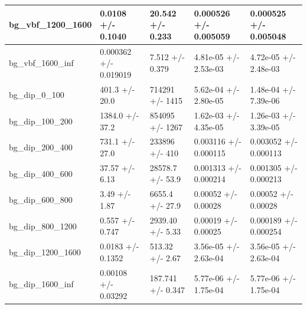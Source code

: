 \documentclass[a4paper, 10pt]{article}
\begin{document}
\begin{table}[H]
\begin{center}
\begin{tabular}{|m{20.0mm}|m{27.0mm}|m{27.0mm}|m{33.0mm}|m{32.0mm}|}
      \hline
      {\cellcolor{white}         bg\_vbf\_1200\_1600}& {\cellcolor{white}         0.0108 +/\-- 0.1040}& {\cellcolor{white}         20.542 +/\-- 0.233}& {\cellcolor{white}         0.000526 +/\-- 0.005059}& {\cellcolor{white}         0.000525 +/\-- 0.005048}\\
      \hline
      {\cellcolor{white}         bg\_vbf\_1600\_inf}& {\cellcolor{white}         0.000362 +/\-- 0.019019}& {\cellcolor{white}         7.512 +/\-- 0.379}& {\cellcolor{white}         4.81e-05 +/\-- 2.53e-03}& {\cellcolor{white}         4.72e-05 +/\-- 2.48e-03}\\
      \hline
      {\cellcolor{white}         bg\_dip\_0\_100}& {\cellcolor{white}         401.3 +/\-- 20.0}& {\cellcolor{white}         714291 +/\-- 1415}& {\cellcolor{white}         5.62e-04 +/\-- 2.80e-05}& {\cellcolor{white}         1.48e-04 +/\-- 7.39e-06}\\
      \hline
      {\cellcolor{white}         bg\_dip\_100\_200}& {\cellcolor{white}         1384.0 +/\-- 37.2}& {\cellcolor{white}         854095 +/\-- 1267}& {\cellcolor{white}         1.62e-03 +/\-- 4.35e-05}& {\cellcolor{white}         1.26e-03 +/\-- 3.39e-05}\\
      \hline
      {\cellcolor{white}         bg\_dip\_200\_400}& {\cellcolor{white}         731.1 +/\-- 27.0}& {\cellcolor{white}         233896 +/\-- 410}& {\cellcolor{white}         0.003116 +/\-- 0.000115}& {\cellcolor{white}         0.003052 +/\-- 0.000113}\\
      \hline
      {\cellcolor{white}         bg\_dip\_400\_600}& {\cellcolor{white}         37.57 +/\-- 6.13}& {\cellcolor{white}         28578.7 +/\-- 53.9}& {\cellcolor{white}         0.001313 +/\-- 0.000214}& {\cellcolor{white}         0.001305 +/\-- 0.000213}\\
      \hline
      {\cellcolor{white}         bg\_dip\_600\_800}& {\cellcolor{white}         3.49 +/\-- 1.87}& {\cellcolor{white}         6655.4 +/\-- 27.9}& {\cellcolor{white}         0.00052 +/\-- 0.00028}& {\cellcolor{white}         0.00052 +/\-- 0.00028}\\
      \hline
      {\cellcolor{white}         bg\_dip\_800\_1200}& {\cellcolor{white}         0.557 +/\-- 0.747}& {\cellcolor{white}         2939.40 +/\-- 5.33}& {\cellcolor{white}         0.00019 +/\-- 0.00025}& {\cellcolor{white}         0.000189 +/\-- 0.000254}\\
      \hline
      {\cellcolor{white}         bg\_dip\_1200\_1600}& {\cellcolor{white}         0.0183 +/\-- 0.1352}& {\cellcolor{white}         513.32 +/\-- 2.67}& {\cellcolor{white}         3.56e-05 +/\-- 2.63e-04}& {\cellcolor{white}         3.56e-05 +/\-- 2.63e-04}\\
      \hline
      {\cellcolor{white}         bg\_dip\_1600\_inf}& {\cellcolor{white}         0.00108 +/\-- 0.03292}& {\cellcolor{white}         187.741 +/\-- 0.347}& {\cellcolor{white}         5.77e-06 +/\-- 1.75e-04}& {\cellcolor{white}         5.77e-06 +/\-- 1.75e-04}\\
\hline
    \end{tabular}
  \end{center}
\end{table}
\end{document}
